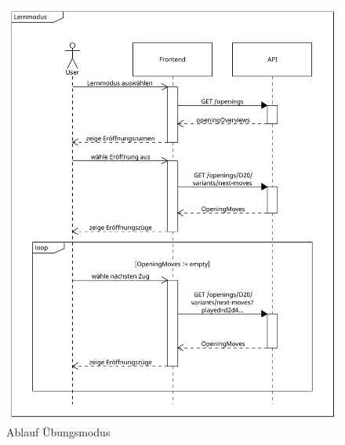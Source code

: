 \begin{figure}
    \includegraphics[width=\linewidth]{images/diagrams/sd_opening_training}
    \caption{Ablauf Übungsmodus}
    \label{fig:sd_opening_training}
\end{figure}
